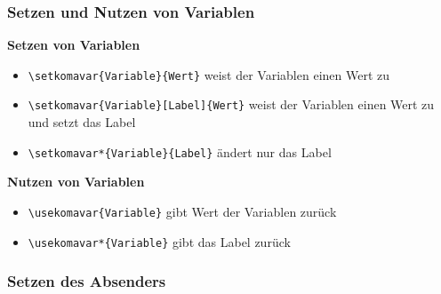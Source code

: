 \documentclass[12pt,ngerman]{beamer}
\begin{document}
\begin{frame}[containsverbatim]
\frametitle{Setzen und Nutzen von Variablen}

\textbf{Setzen von Variablen}

\begin{itemize}
	\item \lstinline|\setkomavar{Variable}{Wert}| weist der Variablen einen Wert zu
	\item \lstinline|\setkomavar{Variable}[Label]{Wert}| weist der Variablen einen Wert zu und setzt das Label
	\item \lstinline|\setkomavar*{Variable}{Label}| ändert nur das Label
\end{itemize}

\textbf{Nutzen von Variablen}

\begin{itemize}
	\item \lstinline|\usekomavar{Variable}| gibt Wert der Variablen zurück
	\item \lstinline|\usekomavar*{Variable}| gibt das Label zurück
\end{itemize}

\end{frame}

\begin{frame}[fragile]
\frametitle{Setzen des Absenders}



\end{frame}
\end{document}
